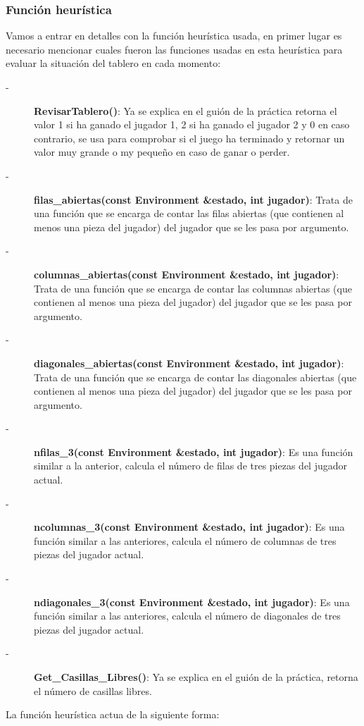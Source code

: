 \documentclass[a4paper, 10pt]{article} %
\begin{document}
\subsubsection{Función heurística}
Vamos a entrar en detalles con la función heurística usada, en primer lugar es necesario mencionar cuales fueron las funciones usadas en esta heurística para evaluar la situación del tablero en cada momento:
\begin{description}
	\item[-] \textbf{RevisarTablero()}: Ya se explica en el guión de la práctica retorna el valor 1 si ha ganado el jugador 1, 2 si ha ganado el jugador 2 y 0 en caso contrario, se usa para comprobar si el juego ha terminado y retornar un valor muy grande o my pequeño en caso de ganar o perder.
	\item[-] \textbf{filas\_abiertas(const Environment \&estado, int jugador)}: Trata de una función que se encarga de contar las filas abiertas (que contienen al menos una pieza del jugador) del jugador que se les pasa por argumento.
	\item[-] \textbf{columnas\_abiertas(const Environment \&estado, int jugador)}: Trata de una función que se encarga de contar las columnas abiertas (que contienen al menos una pieza del jugador) del jugador que se les pasa por argumento.
	\item[-] \textbf{diagonales\_abiertas(const Environment \&estado, int jugador)}: Trata de una función que se encarga de contar las diagonales abiertas (que contienen al menos una pieza del jugador) del jugador que se les pasa por argumento.
	\item[-] \textbf{nfilas\_3(const Environment \&estado, int jugador)}: Es una función similar a la anterior, calcula el número de filas de tres piezas del jugador actual.
	\item[-] \textbf{ncolumnas\_3(const Environment \&estado, int jugador)}: Es una función similar a las anteriores, calcula el número de columnas de tres piezas del jugador actual.
	\item[-] \textbf{ndiagonales\_3(const Environment \&estado, int jugador)}: Es una función similar a las anteriores, calcula el número de diagonales de tres piezas del jugador actual.
	\item[-] \textbf{Get\_Casillas\_Libres()}: Ya se explica en el guión de la práctica, retorna el número de casillas libres.
\end{description}
La función heurística actua de la siguiente forma:
\end{document}
